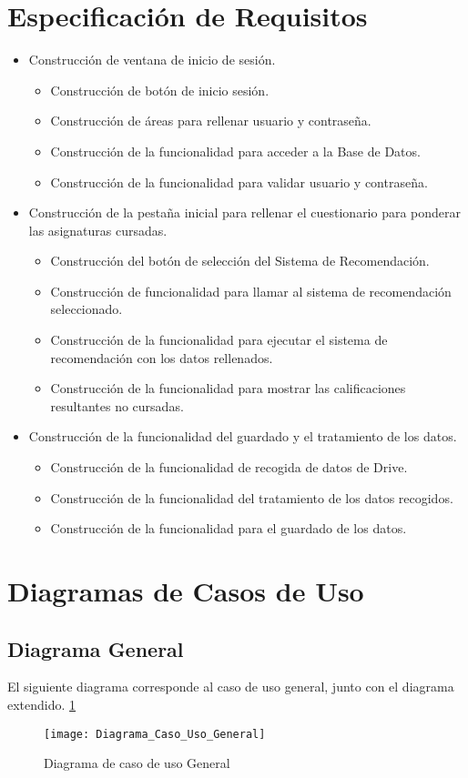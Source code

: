 \section{Especificación de Requisitos}
\begin{itemize}
\item Construcción de ventana de inicio de sesión. 
\begin{itemize}
\item Construcción de botón de inicio sesión. 
\item Construcción de áreas para rellenar usuario y contraseña.  
\item Construcción de la funcionalidad para acceder a la Base de Datos. 
\item Construcción de la funcionalidad para validar usuario y contraseña. 
\end{itemize}
\item Construcción de la pestaña inicial para rellenar el cuestionario para ponderar las asignaturas cursadas. 
\begin{itemize}
\item Construcción del botón de selección del Sistema de Recomendación.
\item Construcción de funcionalidad para llamar al sistema de recomendación  seleccionado. 
\item Construcción de la funcionalidad para ejecutar el sistema de recomendación con los datos rellenados. 
\item Construcción de la funcionalidad para mostrar las calificaciones resultantes no cursadas. 
\end{itemize}
\item Construcción de la funcionalidad del guardado y  el tratamiento de los datos. 
\begin{itemize}
\item Construcción de la funcionalidad de recogida de datos de Drive. 
\item Construcción de la funcionalidad del tratamiento de los datos recogidos. 
\item Construcción de la funcionalidad para el guardado de los datos. 
\end{itemize}
\end{itemize}

\section{Diagramas de Casos de Uso}
\subsection{Diagrama General}
El siguiente diagrama corresponde al  caso de uso general, junto con el diagrama extendido. \ref{fig:Diagrama_Caso_Uso_General}
\begin{figure}[h]
\centering
\texttt{[image: Diagrama\_Caso\_Uso\_General]}
\caption{Diagrama de caso de uso General}
\label{fig:Diagrama_Caso_Uso_General}
\end{figure}

